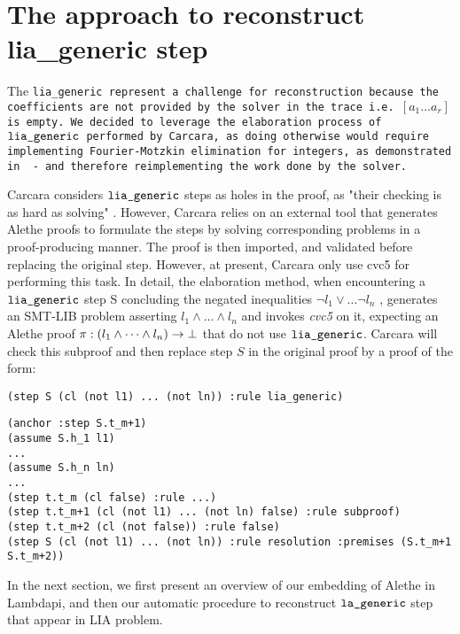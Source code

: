 \section{The approach to reconstruct lia\_generic step}

The \tt{lia\_generic} represent a challenge for reconstruction because the coefficients are not provided by the solver in the trace i.e. \colorbox{orange!30}{$[a_1 \dots a_r]$} is empty.
We decided to leverage the elaboration process of $\tt{lia\_generic}$ performed by Carcara, as doing otherwise would require implementing Fourier-Motzkin elimination for integers, as demonstrated in \cite{omegatest,micromega} -
and therefore reimplementing the work done by the solver.

Carcara considers $\tt{lia\_generic}$ steps as holes in the proof,  as "their checking is as hard as solving" \cite[\S 3.2]{carcara}.
However, Carcara relies on an external tool that generates Alethe proofs to formulate the steps by solving corresponding problems in a proof-producing manner.
The proof is then imported, and validated before replacing the original step. However, at present, Carcara only use cvc5 for performing this task.
In detail, the elaboration method, when encountering a $\tt{lia\_generic}$ step S concluding the negated inequalities $ \neg l_1 \lor \dots \neg l_n$ , generates an SMT-LIB problem asserting $l_1 \land \dots \land l_n$ and invokes \emph{cvc5} on it, expecting an Alethe proof $\pi : (l_1 \land \dots \land l_n) \ra \bot$
that do not use $\tt{lia\_generic}$. Carcara will check this subproof and then replace step $S$ in the original proof by a proof of the form:

\begin{lstlisting}[language=SMT]
(step S (cl (not l1) ... (not ln)) :rule lia_generic)
\end{lstlisting}

\begin{center}
\lightning
\end{center}

\begin{lstlisting}[language=SMT,caption={Elaboration of $\tt{lia\_generic}$},label={lst:elab_lia}]
(anchor :step S.t_m+1)
(assume S.h_1 l1)
...
(assume S.h_n ln)
...
(step t.t_m (cl false) :rule ...)
(step t.t_m+1 (cl (not l1) ... (not ln) false) :rule subproof)
(step t.t_m+2 (cl (not false)) :rule false)
(step S (cl (not l1) ... (not ln)) :rule resolution :premises (S.t_m+1 S.t_m+2))
\end{lstlisting}

In the next section, we first present an overview of our embedding of Alethe in Lambdapi, and then our automatic procedure to reconstruct $\tt{la\_generic}$ step that appear in LIA problem.
